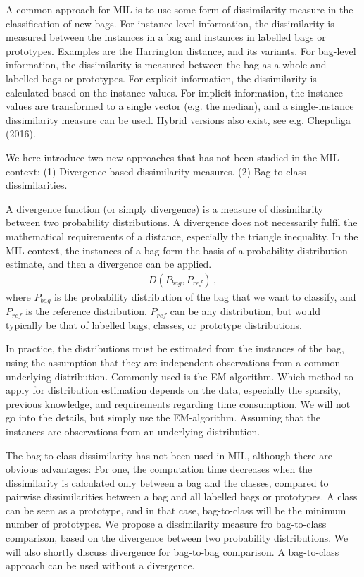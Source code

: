 A common approach for MIL is to use some form of dissimilarity measure in the classification of new bags. 
For instance-level information, the dissimilarity is measured between the instances in a bag and instances in labelled bags or prototypes. 
Examples are the Harrington distance, and its variants. 
For bag-level information, the dissimilarity is measured between the bag as a whole and labelled bags or prototypes. 
For explicit information, the dissimilarity is calculated based on the instance values.
For implicit information, the instance values are transformed to a single vector (e.g. the median), and a single-instance dissimilarity measure can be used. 
Hybrid versions also exist, see e.g. {\color{green} Chepuliga (2016)}. 

We here introduce two new approaches that has not been studied in the MIL context: 
(1) Divergence-based dissimilarity measures. 
(2) Bag-to-class dissimilarities. 

A divergence function (or simply divergence) is a measure of dissimilarity between two probability distributions.
A divergence does not necessarily fulfil the mathematical requirements of a distance, especially the triangle inequality. 
In the MIL context, the instances of a bag form the basis of a probability distribution estimate, and then a divergence can be applied. \\
\begin{align}
  D(P_{bag}, P_{ref})\, ,
\end{align}
where $P_{bag}$ is the probability distribution of the bag that we want to classify, and $P_{ref}$ is the reference distribution. 
$P_{ref}$ can be any distribution, but would typically be that of labelled bags, classes, or prototype distributions. 

In practice, the distributions must be estimated from the instances of the bag, using the assumption that they are independent observations from a common underlying distribution. 
Commonly used is the EM-algorithm.
Which method to apply for distribution estimation depends on the data, especially the sparsity, previous knowledge, and requirements regarding time consumption. 
We will not go into the details, but simply use the EM-algorithm.
Assuming that the instances are observations from an underlying distribution. 

The bag-to-class dissimilarity has not been used in MIL, although there are obvious advantages:
For one, the computation time decreases when the dissimilarity is calculated only between a bag and the classes, compared to pairwise dissimilarities between a bag and all labelled bags or prototypes. 
A class can be seen as a prototype, and in that case, bag-to-class will be the minimum number of prototypes. 
We propose a dissimilarity measure fro bag-to-class comparison, based on the divergence between two probability distributions. 
We will also shortly discuss divergence for bag-to-bag comparison. 
A bag-to-class approach can be used without a divergence. 

